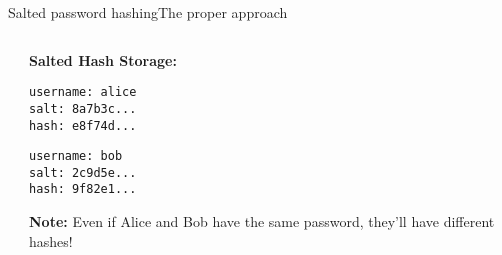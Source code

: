\documentclass[aspectratio=169, lualatex, handout]{beamer}
\begin{document}
\begin{frame}{Salted password hashing}{The proper approach}
	\begin{columns}[c]
		\begin{column}{0.5\textwidth}
		\end{column}
		\begin{column}{0.5\textwidth}
			\begin{tcolorbox}[colback=black!5!white,colframe=ciphergray]
				\small
				\textbf{Salted Hash Storage:}

				\vspace{0.2cm}

				\texttt{username: alice}\\
				\texttt{salt: 8a7b3c...}\\
				\texttt{hash: e8f74d...}

				\vspace{0.2cm}

				\texttt{username: bob}\\
				\texttt{salt: 2c9d5e...}\\
				\texttt{hash: 9f82e1...}

				\vspace{0.3cm}

				\textcolor{cipherprimary}{\textbf{Note:} \scriptsize Even if Alice and Bob have the same password, they'll have different hashes!}
			\end{tcolorbox}
		\end{column}
	\end{columns}
\end{frame}
\end{document}
